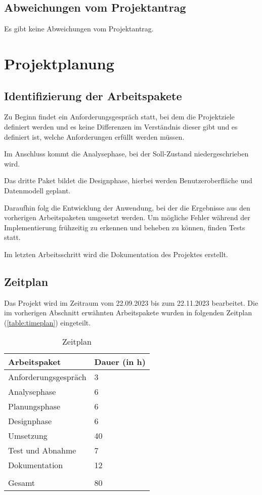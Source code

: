 \documentclass[12pt]{article}
\begin{document}
\subsection{Abweichungen vom Projektantrag}
Es gibt keine Abweichungen vom Projektantrag.


%
%

\section{Projektplanung}

\subsection{Identifizierung der Arbeitspakete}
Zu Beginn findet ein Anforderungsgespräch statt, bei dem die Projektziele 
definiert werden und es keine Differenzen im Verständnis dieser gibt und es 
definiert ist, welche Anforderungen erfüllt werden müssen. 

Im Anschluss kommt die Analysephase, bei der Soll-Zustand niedergeschrieben wird.  

Das dritte Paket bildet die Designphase, hierbei werden Benutzeroberfläche und 
Datenmodell geplant.  

Daraufhin folg die Entwicklung der Anwendung, bei der die Ergebnisse aus den 
vorherigen Arbeitspaketen umgesetzt werden. Um mögliche Fehler während der 
Implementierung frühzeitig zu erkennen und beheben zu können, finden Tests statt. 

Im letzten Arbeitsschritt wird die Dokumentation des Projektes erstellt. 

\subsection{Zeitplan}
Das Projekt wird im Zeitraum vom 22.09.2023 bis zum 22.11.2023 bearbeitet. 
Die im vorherigen Abschnitt erwähnten Arbeitspakete wurden in folgenden Zeitplan 
(\autoref{table:timeplan}) eingeteilt. 

\begin{table}[H]
    \centering
    \begin{tabular}{|l | l|}
        \hline
        Arbeitspaket & Dauer (in h) \\
        \hline
        Anforderungsgespräch & 3 \\
        Analysephase & 6 \\
        Planungsphase & 6 \\
        Designphase & 6 \\
        Umsetzung & 40 \\
        Test und Abnahme & 7 \\
        Dokumentation & 12 \\
        &\\
        Gesamt & 80 \\
        \hline
    \end{tabular}
    \caption{Zeitplan}
    \label{table:timeplan}
\end{table}
\end{document}

